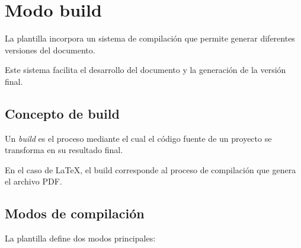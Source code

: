 %
%
%
%
%
%
%
%
%


\chapter{Modo build}

La plantilla incorpora un sistema de compilación que
permite generar diferentes versiones del documento.

Este sistema facilita el desarrollo del documento y
la generación de la versión final.




\section{Concepto de build}

\begin{definitionbox}[Build]
Un \textit{build} es el proceso mediante el cual el
código fuente de un proyecto se transforma en su
resultado final.
\end{definitionbox}

En el caso de \LaTeX{}, el build corresponde al
proceso de compilación que genera el archivo PDF.




\section{Modos de compilación}

La plantilla define dos modos principales:

